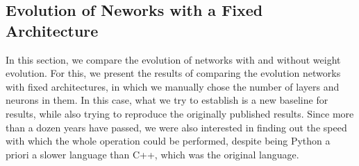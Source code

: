 \documentclass[runningheads]{llncs}
\begin{document}



\subsection{Evolution of Neworks with a Fixed Architecture}

In this section, we compare the evolution of networks with and without weight
evolution. For this, we present the results of comparing the evolution networks
with fixed architectures, in which we manually chose the number of layers and
neurons in them. In this case, what we try to establish is a new
baseline for results, while also trying to reproduce the originally
published results. Since more than a dozen years have passed, we were
also interested in finding out the speed with which the whole
operation could be performed, despite being Python a priori a slower
language than C++, which was the original language.
\end{document}
